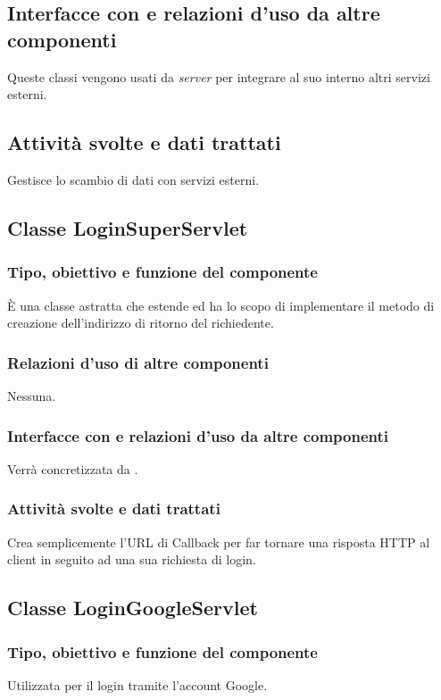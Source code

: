 \subsection*{Interfacce con e relazioni d'uso da altre componenti}
Queste classi vengono usati da \emph{server} per integrare al suo interno
altri servizi esterni.
\subsection*{Attivit\`a svolte e dati trattati}
Gestisce lo scambio di dati con servizi esterni.

\subsection{Classe LoginSuperServlet}
\subsubsection*{Tipo, obiettivo e funzione del componente}
\`E una classe astratta che estende  ed ha lo scopo di
implementare il metodo di creazione dell'indirizzo di ritorno del richiedente.

\subsubsection*{Relazioni d'uso di altre componenti}
Nessuna.

\subsubsection*{Interfacce con e relazioni d'uso da altre componenti}
Verr\`a concretizzata da .

\subsubsection*{Attivit\`a svolte e dati trattati}
Crea semplicemente l'URL di Callback per far tornare una risposta HTTP al
client in seguito ad una sua richiesta di login.

\subsection{Classe LoginGoogleServlet}
\subsubsection*{Tipo, obiettivo e funzione del componente}
Utilizzata per il login tramite l'account Google.

